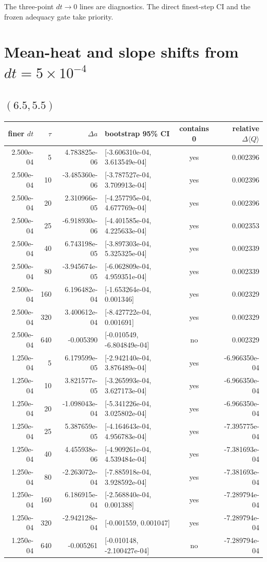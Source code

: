 \documentclass[10pt]{article}
\begin{document}
The three-point $dt\to0$ lines are diagnostics.  The direct finest-step CI
and the frozen adequacy gate take priority.

\section{Mean-heat and slope shifts from $dt=5\times10^{-4}$}
\scriptsize
\subsection*{$(6.5,5.5)$}
\begin{longtable}{r r r l c r}
\toprule
finer $dt$ & $\tau$ & $\Delta a$ & bootstrap 95\% CI & contains 0 & relative $\Delta\langle Q\rangle$\\
\midrule
\endfirsthead
2.500e-04 & 5 & 4.783825e-06 & [-3.606310e-04, 3.613549e-04] & yes & 0.002396 \\
2.500e-04 & 10 & -3.485360e-06 & [-3.787527e-04, 3.709913e-04] & yes & 0.002396 \\
2.500e-04 & 20 & 2.310966e-05 & [-4.257795e-04, 4.677769e-04] & yes & 0.002396 \\
2.500e-04 & 25 & -6.918930e-06 & [-4.401585e-04, 4.225633e-04] & yes & 0.002353 \\
2.500e-04 & 40 & 6.743198e-05 & [-3.897303e-04, 5.325325e-04] & yes & 0.002339 \\
2.500e-04 & 80 & -3.945674e-05 & [-6.062809e-04, 4.959351e-04] & yes & 0.002339 \\
2.500e-04 & 160 & 6.196482e-04 & [-1.653264e-04, 0.001346] & yes & 0.002329 \\
2.500e-04 & 320 & 3.400612e-04 & [-8.427722e-04, 0.001691] & yes & 0.002329 \\
2.500e-04 & 640 & -0.005390 & [-0.010549, -6.804849e-04] & no & 0.002329 \\
1.250e-04 & 5 & 6.179599e-05 & [-2.942140e-04, 3.876489e-04] & yes & -6.966350e-04 \\
1.250e-04 & 10 & 3.821577e-05 & [-3.265993e-04, 3.627173e-04] & yes & -6.966350e-04 \\
1.250e-04 & 20 & -1.098043e-04 & [-5.341226e-04, 3.025802e-04] & yes & -6.966350e-04 \\
1.250e-04 & 25 & 5.387659e-05 & [-4.164643e-04, 4.956783e-04] & yes & -7.395775e-04 \\
1.250e-04 & 40 & 4.455938e-06 & [-4.909261e-04, 4.539484e-04] & yes & -7.381693e-04 \\
1.250e-04 & 80 & -2.263072e-04 & [-7.885918e-04, 3.928592e-04] & yes & -7.381693e-04 \\
1.250e-04 & 160 & 6.186915e-04 & [-2.568840e-04, 0.001388] & yes & -7.289794e-04 \\
1.250e-04 & 320 & -2.942128e-04 & [-0.001559, 0.001047] & yes & -7.289794e-04 \\
1.250e-04 & 640 & -0.005261 & [-0.010148, -2.100427e-04] & no & -7.289794e-04 \\
\bottomrule
\end{longtable}
\end{document}
